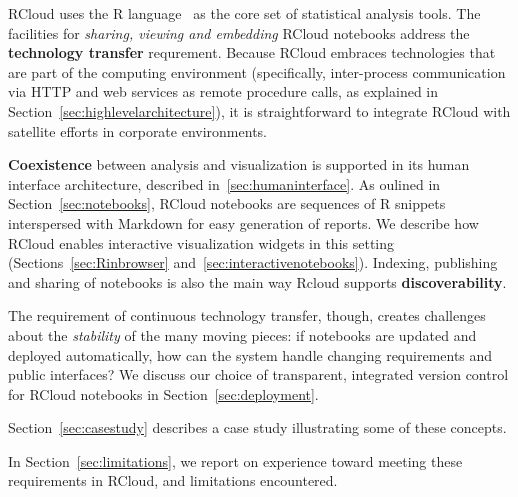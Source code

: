 %

RCloud uses the R language~\cite{RCoreTeam:2013:R} as the core set
of statistical analysis tools.  The facilities for \emph{sharing, viewing
and embedding} RCloud notebooks address the {\bf technology transfer} requrement.
Because RCloud embraces technologies that are part of the computing
environment (specifically, inter-process communication via HTTP and
web services as remote procedure calls, as explained
in Section~\ref{sec:highlevelarchitecture}), it is straightforward to
integrate RCloud with satellite efforts in corporate environments.

{\bf Coexistence} between analysis and visualization is supported in
its human interface architecture, described in~\ref{sec:humaninterface}. 
As oulined in Section~\ref{sec:notebooks}, RCloud notebooks are sequences
of R snippets interspersed with Markdown for easy generation of reports.
We describe how RCloud enables interactive visualization widgets in
this setting (Sections~\ref{sec:Rinbrowser} and~\ref{sec:interactivenotebooks}).
Indexing, publishing and sharing of notebooks is also the main way
Rcloud supports {\bf discoverability}.

The requirement of continuous technology transfer, though, creates challenges
about the \emph{stability} of the many moving pieces: if notebooks are
updated and deployed automatically, how can the system handle
changing requirements and public interfaces? We discuss our choice of
transparent, integrated version control for RCloud notebooks in 
Section~\ref{sec:deployment}.

Section~\ref{sec:casestudy} describes a case study illustrating some of these concepts.

In Section~\ref{sec:limitations}, we report on experience toward meeting
these requirements in RCloud, and limitations encountered.  



